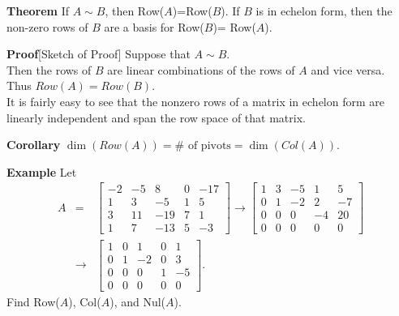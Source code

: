  \begin{frame}[fragile]
\textbf{Theorem}
If $A \sim B$, then Row($A$)=Row($B$).  If $B$ is in echelon form, then the non-zero rows of 
$B$ are a basis for Row($B$)= Row($A$).



\textbf{Proof}[Sketch of Proof]
Suppose that $A\sim B$.  \\ 
Then the rows of $B$ are linear combinations of the rows of $A$  and vice versa.  \\ 
Thus $Row(A)=Row(B)$.  \\ 

It is fairly easy to see that the nonzero rows of a matrix in echelon form are linearly independent and span the row space of that matrix.



\textbf{Corollary}
$\dim(Row(A)) = \mbox{$\#$ of pivots} = \dim(Col(A))$.

\end{frame}






 \begin{frame}[fragile]
\textbf{Example}
Let 
\begin{eqnarray*}
A &=& \displaystyle
\left[ \begin{array}{rrrrrr} 
-2 & -5 & 8 & 0 & -17\\
1 & 3 & -5 & 1 & 5  \\
3 & 11 & -19 & 7 & 1 \\
1 & 7 & -13 & 5 & -3 
\end{array} \right] \rightarrow 
\left[ \begin{array}{rrrrrr}
1 & 3 & -5 & 1 & 5\\
0 & 1 & -2 & 2 & -7\\
0 & 0 & 0 & -4 & 20\\
0 & 0 & 0 & 0 & 0
\end{array} \right]  \\
&\rightarrow&
\left[ \begin{array}{rrrrrr}
1 & 0 & 1 & 0 & 1\\
0 & 1 & -2 & 0 & 3\\
0 & 0 & 0 & 1 & -5\\
0 & 0 & 0 & 0 & 0
\end{array} \right].
\end{eqnarray*}
Find Row($A$), Col($A$), and Nul($A$).

\end{frame}





